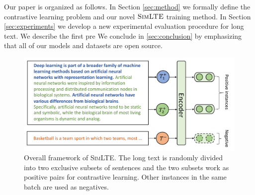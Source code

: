 \documentclass[11pt]{article}
\newcommand{\our}{\mbox{\textsc{SimLTE}}}
\begin{document}

Our paper is organized as follows.
In Section \ref{sec:method} we formally define the contrastive learning problem and our novel $\our$ training method.
In Section \ref{sec:experiments} we develop a new experimental evaluation procedure for long text.
We describe the first pre
We conclude in \ref{sec:conclusion} by emphasizing that all of our models and datasets are open source.


\begin{figure}
\includegraphics[width=\columnwidth]{fig/simlte.pdf}
\caption{Overall framework of \our. The long text is randomly divided into two exclusive subsets of sentences and the two subsets work as positive pairs for contrastive learning. Other instances in the same batch are used as negatives.
}

\label{overall}
\end{figure}
\end{document}
